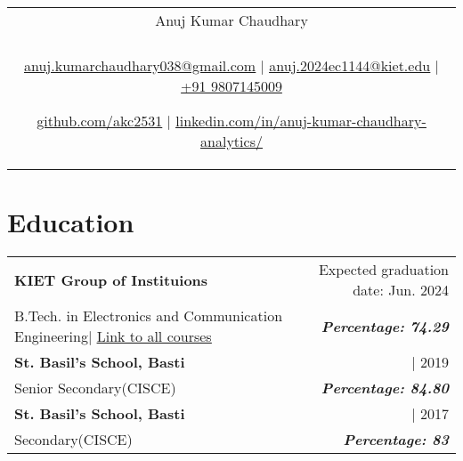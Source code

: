 \documentclass[a4paper,8pt]{article}
\begin{document}
\pagestyle{empty} 


\begin{tabularx}{\linewidth}{@{} C @{}}
\color[HTML]{1C033C} \Huge{Anuj Kumar Chaudhary} \\[6pt]
\\
\textcolor[HTML]{371e77}{\underline{\href{mailto:your@email.com}{\raisebox{-0.05\height}{\faEnvelope} anuj.kumarchaudhary038@gmail.com}} $|$}
\textcolor[HTML]{371e77}{\underline{\href{mailto:anuj.kumarchaudhary038@gmail.com}{\raisebox{-0.05\height}{\faEnvelope} anuj.2024ec1144@kiet.edu}} $|$}
\textcolor[HTML]{371e77}{\href{tel:+919807145009}{\raisebox{-0.05\height}{\faMobile} +91 9807145009}}

\textcolor[HTML]{371e77}{\underline{\href{https://github.com/akc2531}{\raisebox{-0.05\height}{\faGithub} github.com/akc2531}} $|$}
\textcolor[HTML]{371e77}{\underline{\href{https://www.linkedin.com/in/anuj-kumar-chaudhary-analytics/}{\raisebox{-0.05\height}{\faLinkedin} linkedin.com/in/anuj-kumar-chaudhary-analytics/}}}
\end{tabularx}

\section{Education}
\begin{tabularx}{\linewidth}{ @{}l r@{} }
\color[HTML]{1C033C} \textbf{KIET Group of Instituions} & \hfill \color[HTML]{371e77} Expected graduation date: Jun. 2024 \\
\color[HTML]{371e77} B.Tech. in Electronics and Communication Engineering$|$ {\uline{\href{https://akc2531.github.io/MyPortfolio/}{Link to all courses}}} & \hfill \color[HTML]{4B28A4} \textit{\textbf{Percentage: 74.29}} \\
\color[HTML]{1C033C} \textbf{St. Basil's School, Basti} & \hfill \color[HTML]{371e77} | 2019 \\
\color[HTML]{371e77} Senior Secondary(CISCE)  & \hfill \color[HTML]{4B28A4} \textit{\textbf{Percentage: 84.80}} \\
\color[HTML]{1C033C} \textbf{St. Basil's School, Basti} & \hfill \color[HTML]{371e77} | 2017 \\
\color[HTML]{371e77} Secondary(CISCE)  & \hfill \color[HTML]{4B28A4} \textit{\textbf{Percentage: 83}} \\
\end{tabularx}


\end{document}
